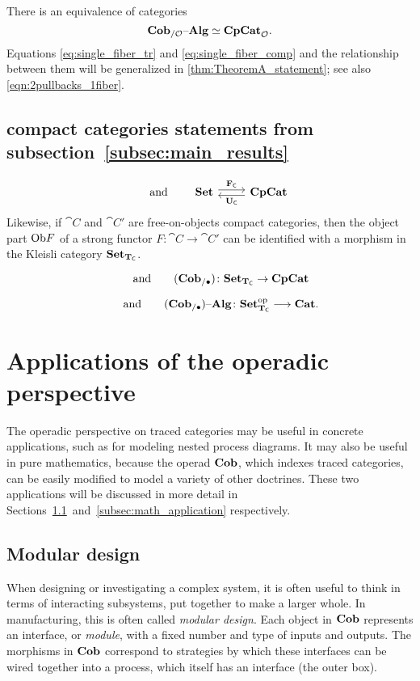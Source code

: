 \documentclass[11pt,oneside,article]{memoir}
\begin{document}
{There is an equivalence of categories
\begin{equation}
      \label{eq:single_fiber_comp}
   \mathbf{Cob}_{/\mathcal{O}}{\text \textendash}\mathbf{Alg}\simeq\mathbf{CpCat}_{\mathcal{O}}.
\end{equation}
Equations \eqref{eq:single_fiber_tr} and \eqref{eq:single_fiber_comp} and the relationship between
them will be generalized in \ref{thm:TheoremA_statement}; see also \eqref{eqn:2pullbacks_1fiber}.


\subsection{compact categories statements from subsection~\ref{subsec:main_results}}

\[
   \qquad\text{and}\qquad
   \Adjoint{\Set}{\CompCat}{\FC}{\UC}
\]
 Likewise, if $\cat{C}$ and $\cat{C}'$ are free-on-objects compact categories, then the object part $\mathrm{Ob} F$ of a strong functor $F\colon\cat{C}\to\cat{C}'$ can be identified with a morphism in the Kleisli category $\mathbf{Set}_{\mathbf{T}_{\mathsf{C}}}$.

 \[\qquad\text{and}
   \qquad
   (\mathbf{Cob}_{/\bullet})\colon\mathbf{Set}_{\mathbf{T}_{\mathsf{C}}}\to\mathbf{CpCat}
\]

\begin{equation}
   \qquad\text{and}\qquad
   (\mathbf{Cob}_{/\bullet}){\text \textendash}\mathbf{Alg}\colon\mathbf{Set}_{\mathbf{T}_{\mathsf{C}}}^{\mathrm{op}}\longrightarrow\mathbf{Cat}.
\end{equation}

 
}%

\section{Applications of the operadic perspective}

The operadic perspective on traced categories may be useful in concrete applications, such as for
modeling nested process diagrams. It may also be useful in pure mathematics, because the operad $\mathbf{Cob}$,
which indexes traced categories, can be easily modified to model a variety of other doctrines.
These two applications will be discussed in more detail in
Sections~\ref{subsec:modular}~and~\ref{subsec:math_application} respectively.

\subsection{Modular design}
      \label{subsec:modular}

When designing or investigating a complex system, it is often useful to think in terms of
interacting subsystems, put together to make a larger whole. In manufacturing, this is often called
\emph{modular design}. Each object in $\mathbf{Cob}$ represents an interface, or \emph{module}, with a
fixed number and type of inputs and outputs. The morphisms in $\mathbf{Cob}$ correspond to strategies by
which these interfaces can be wired together into a process, which itself has an interface (the outer box).
\end{document}
